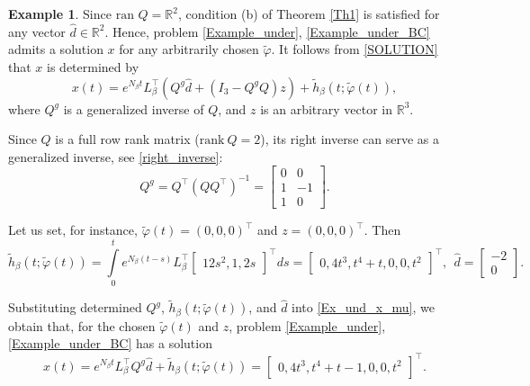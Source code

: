 \documentclass[preprint,12pt]{elsarticle}
\numberwithin{equation}{section}
\theoremstyle{definition}
\newtheorem{example}[theorem]{Example}
\begin{document}
\begin{example}
 Since $\text{ran }Q=\mathbb{R}^2$, condition (b) of Theorem \ref{Th1} is satisfied for any vector $\widehat{d}\in \mathbb{R}^2$.  Hence,  problem \eqref{Example_under}, \eqref{Example_under_BC} admits a solution $x$ for any arbitrarily chosen $\widetilde{\varphi}$. It follows from \eqref{SOLUTION} that $x$ is determined by
\begin{equation}\label{Ex_und_x_mu}
    x(t)=e^{N_{\beta}t}L_{\beta}^\top\left(Q^g\widehat{d}+(I_3-Q^gQ)z\right) + \widetilde{h}_{\beta}(t; \widetilde{\varphi}(t)),
   \end{equation}
where $Q^g$ is a generalized inverse of $Q$, and $z$ is an arbitrary vector in $\mathbb{R}^3$.

Since $Q$ is a full row rank matrix ($\text{rank}~Q=2$), its right inverse can serve as a generalized inverse, see \eqref{right_inverse}: 
\begin{equation*}
Q^g=Q^\top\left(QQ^\top\right)^{-1}=\begin{bmatrix}
        0&0\\1&-1\\1&0
    \end{bmatrix}.
\end{equation*}


Let us set, for instance, $\widetilde{\varphi}(t)=(0, 0, 0)^\top$ and $z=(0, 0, 0)^\top$. Then
\begin{equation*}
    \widetilde{h}_{\beta}(t; \widetilde{\varphi}(t))=\int\limits_0^t e^{N_\beta(t-s)}L_\beta^\top\begin{bmatrix}
        12s^2,1,2s
    \end{bmatrix}^\top ds=\begin{bmatrix}
    0,4t^3,t^4+t,0,0,t^2
\end{bmatrix}^\top,~~\widehat{d}=\begin{bmatrix}
         -2\\0
     \end{bmatrix}.
\end{equation*}



Substituting determined $Q^g$, $\widetilde{h}_{\beta}(t; \widetilde{\varphi}(t))$, and $\widehat{d}$ into \eqref{Ex_und_x_mu}, we obtain that, for the chosen $\widetilde{\varphi}(t)$ and $z$, problem \eqref{Example_under}, \eqref{Example_under_BC} has a solution
\begin{equation*}
     x(t)=e^{N_{\beta}t}L_{\beta}^\top Q^g\widehat{d} + \widetilde{h}_{\beta}(t; \widetilde{\varphi}(t))=\begin{bmatrix}
         0, 4t^3, t^4+t-1, 0, 0, t^2
     \end{bmatrix}^\top.
   \end{equation*}
\end{example}
\end{document}
